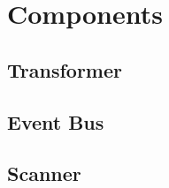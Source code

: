 %
%
%

%

\section{Components}
\label{sec:components}

\subsection{Transformer}

\subsection{Event Bus}

\subsection{Scanner}

